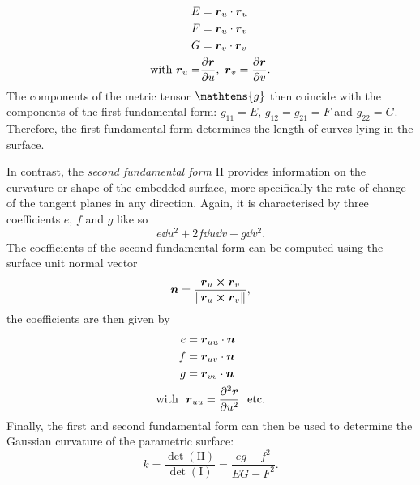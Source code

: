 \begin{equation}
    \begin{split}
        E &= \vb*{r}_u \cdot \vb*{r}_u \\
        F &= \vb*{r}_u \cdot \vb*{r}_v \\
        G &= \vb*{r}_v \cdot \vb*{r}_v \\
        \text{with }  \vb*{r}_u = & \pdv{\vb*{r}}{u},\ \vb*{r}_v = \pdv{\vb*{r}}{v}.
    \end{split}
    \label{eq:first_fform}
\end{equation}
The components of the metric tensor \(\mathtens{g}\) then coincide with the components of the first fundamental form: \(g_{11} = E\), \(g_{12} = g_{21}= F\) and \(g_{22} = G\). Therefore, the first fundamental form determines the length of curves lying in the surface.

In contrast, the \emph{second fundamental form} II provides information on the curvature or shape of the embedded surface, more specifically the rate of change of the tangent planes in any direction. Again, it is characterised by three coefficients \(e\), \(f\) and \(g\) like so 
\[ e\dd{u}^2 + 2f\dd{u}\dd{v} + g\dd{v}^2. \]
The coefficients of the second fundamental form can be computed using the surface unit normal vector 
\begin{equation}
    \vb*{n} =  \frac{\vb*{r}_u \cross \vb*{r}_v}{\norm{\vb*{r}_u \cross \vb*{r}_v}},
    \label{eq:unit_normal}
\end{equation}
the coefficients are then given by
\begin{equation}
    \begin{split}
        e &= \vb*{r}_{uu} \cdot \vb*{n}\\
        f &= \vb*{r}_{uv} \cdot \vb*{n}\\
        g &= \vb*{r}_{vv} \cdot \vb*{n}\\
        \text{with }\ & \vb*{r}_{uu} = \pdv[2]{\vb*{r}}{u}\ \text{ etc.}
    \end{split}
    \label{eq:second_fform}
\end{equation}
Finally, the first and second fundamental form can then be used to determine the Gaussian curvature of the parametric surface: \cite{ONeill2006, Spivak1999b}
\begin{equation}
    k = \frac{\det(\mathrm{II})}{\det(\mathrm{I})} = \frac{eg - f^2}{EG - F^2}.
    \label{eq:gaussian_curv}
\end{equation}

